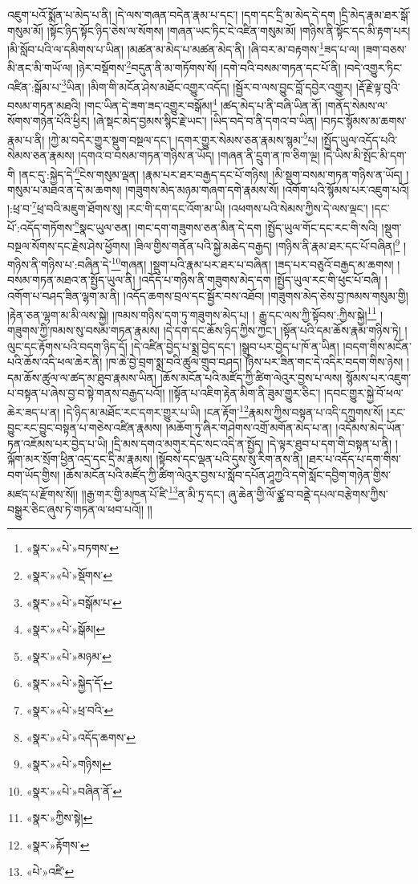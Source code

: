 འཇུག་པའོ་སྨོན་པ་མེད་པ་ནི། །དེ་ལས་གཞན་བདེན་རྣམ་པ་དང་། །དག་དང་དྲི་མ་མེད་དེ་དག །དྲི་མེད་རྣམ་ཐར་སྒོ་གསུམ་མོ། །སྟོང་ཉིད་སྟོང་ཉིད་ཅེས་ལ་སོགས། །གཞན་ཡང་ཏིང་ངེ་འཛིན་གསུམ་མོ། །གཉིས་ནི་སྟོང་དང་མི་རྟག་པར། །མི་སློབ་པའི་ལ་དམིགས་པ་ཡིན། །མཚན་མ་མེད་པ་མཚན་མེད་ནི། །ཞི་བར་མ་བརྟགས་\footnote{«སྣར་»«པེ་»བཏགས་}ཟད་པ་ལ། །ཟག་བཅས་མི་ནང་མི་གཡོ་ལ། །ཉེར་བསྡོགས་\footnote{«སྣར་»«པེ་»སྡོགས་}བདུན་ནི་མ་གཏོགས་སོ། །དགེ་བའི་བསམ་གཏན་དང་པོ་ནི། །བདེ་འགྱུར་ཏིང་འཛིན་:སྒོམ་པ་\footnote{«སྣར་»«པེ་»བསྒོམ་པ་}ཡིན། །མིག་གི་མངོན་ཤེས་མཐོང་འགྱུར་འདོད། །སྦྱོར་བ་ལས་བྱུང་བློ་དབྱེར་འགྱུར། །རྡོ་རྗེ་ལྟ་བུའི་བསམ་གཏན་མཐའི། །གང་ཡིན་དེ་ཟག་ཟད་འགྱུར་བསྒོམ།\footnote{«སྣར་»«པེ་»སྒོམ།} །ཚད་མེད་པ་ནི་བཞི་ཡིན་ནོ། །གནོད་སེམས་ལ་སོགས་གཉེན་པོའི་ཕྱིར། །ཞེ་སྡང་མེད་བྱམས་སྙིང་རྗེ་ཡང་། །ཡིད་བདེ་བ་ནི་དགའ་བ་ཡིན། །བཏང་སྙོམས་མ་ཆགས་རྣམ་པ་ནི། །ཀྱེ་མ་བདེར་གྱུར་སྡུག་བསྔལ་དང་། །དགར་གྱུར་སེམས་ཅན་རྣམས་སྙམ་\footnote{«སྣར་»«པེ་»མཉམ་}པ། །སྤྱོད་ཡུལ་འདོད་པའི་སེམས་ཅན་རྣམས། །དགའ་བ་བསམ་གཏན་གཉིས་ན་ཡོད། །གཞན་ནི་དྲུག་ན་ཁ་ཅིག་ལྔ། །དེ་ཡིས་མི་སྤོང་མི་དག་གི །ནང་དུ་:སྐྱེད་དེ་\footnote{«སྣར་»«པེ་»སྐྱེད་དོ་}ངེས་གསུམ་ལྡན། །རྣམ་པར་ཐར་བརྒྱད་དང་པོ་གཉིས། །མི་སྡུག་བསམ་གཏན་གཉིས་ན་ཡོད། །གསུམ་པ་མཐའ་ན་དེ་མ་ཆགས། །གཟུགས་མེད་མཉམ་གཞག་དགེ་རྣམས་སོ། །འགོག་པའི་སྙོམས་པར་འཇུག་པའོ། །:ཕྲ་བ་\footnote{«སྣར་»«པེ་»ཕྲ་བའི་}ཕྲ་བའི་མཇུག་ཐོགས་སུ། །རང་གི་དག་དང་འོག་མ་ཡི། །འཕགས་པའི་སེམས་ཀྱིས་དེ་ལས་ལྡང་། །དང་པོ་:འདོད་གཏོགས་\footnote{«སྣར་»«པེ་»འདོད་ཆགས་}སྣང་ཡུལ་ཅན། །གང་དག་གཟུགས་ཅན་མིན་དེ་དག །སྤྱོད་ཡུལ་གོང་དང་རང་གི་སའི། །སྡུག་བསྔལ་སོགས་དང་རྗེས་ཤེས་ཕྱོགས། །ཟིལ་གྱིས་གནོན་པའི་སྐྱེ་མཆེད་བརྒྱད། །གཉིས་ནི་རྣམ་ཐར་དང་པོ་བཞིན།\footnote{«སྣར་»«པེ་»གཉིས།} །གཉིས་ནི་གཉིས་པ་:བཞིན་དེ་\footnote{«སྣར་»«པེ་»བཞིན་ནོ་}གཞན། །སྡུག་པའི་རྣམ་པར་ཐར་པ་བཞིན། །ཟད་པར་བཅུའོ་བརྒྱད་མ་ཆགས། །བསམ་གཏན་མཐའ་ན་སྤྱོད་ཡུལ་ནི། །འདོད་པ་གཉིས་ནི་གཟུགས་མེད་དག །སྤྱོད་ཡུལ་རང་གི་ཕུང་པོ་བཞི། །འགོག་པ་བཤད་ཟིན་ལྷག་མ་ནི། །འདོད་ཆགས་བྲལ་དང་སྦྱོར་བས་འཐོབ། །གཟུགས་མེད་ཅེས་བྱ་ཁམས་གསུམ་གྱི། །རྟེན་ཅན་ལྷག་མ་མི་ལས་སྐྱེ། །ཁམས་གཉིས་དག་ཏུ་གཟུགས་མེད་པ། །
རྒྱུ་དང་ལས་ཀྱི་སྟོབས་:ཀྱིས་སྐྱེ།\footnote{«སྣར་»ཀྱིས་སྟེ།} །གཟུགས་ཀྱི་ཁམས་སུ་བསམ་གཏན་རྣམས། །དེ་དག་དང་ཆོས་ཉིད་ཀྱིས་ཀྱང་། །སྟོན་པའི་དམ་ཆོས་རྣམ་གཉིས་ཏེ། །ལུང་དང་རྟོགས་པའི་བདག་ཉིད་དོ། །དེ་འཛིན་བྱེད་པ་སྨྲ་བྱེད་དང་། །སྒྲུབ་པར་བྱེད་པ་ཁོ་ན་ཡིན། །བདག་གིས་མངོན་པའི་ཆོས་འདི་ཕལ་ཆེར་ནི། །ཁ་ཆེ་བྱེ་བྲག་སྨྲ་བའི་ཚུལ་གྲུབ་བཤད། །ཉེས་པར་ཟིན་གང་དེ་འདིར་བདག་གིས་ཉེས། །དམ་ཆོས་ཚུལ་ལ་ཚད་མ་ཐུབ་རྣམས་ཡིན། །ཆོས་མངོན་པའི་མཛོད་ཀྱི་ཚིག་ལེའུར་བྱས་པ་ལས། སྙོམས་པར་འཇུག་པ་བསྟན་པ་ཞེས་བྱ་བ་སྟེ་གནས་བརྒྱད་པའོ།། །།སྟོན་པ་འཇིག་རྟེན་མིག་ནི་ཟུམ་གྱུར་ཅིང་། །དབང་གྱུར་སྐྱེ་བོ་ཕལ་ཆེར་ཟད་པ་ན། །དེ་ཉིད་མ་མཐོང་རང་དགར་གྱུར་པ་ཡི། །ངན་རྟོག་\footnote{«སྣར་»རྟོགས་}རྣམས་ཀྱིས་བསྟན་པ་འདི་དཀྲུགས་སོ། །རང་བྱུང་རང་བྱུང་བསྟན་པ་གཅེས་འཛིན་རྣམས། །མཆོག་ཏུ་ཞིར་གཤེགས་འགྲོ་མགོན་མེད་པ་ན། །འདོམས་མེད་ཡོན་ཏན་འཇོམས་པར་བྱེད་པ་ཡི། །དྲི་མས་དགའ་མགུར་དེང་སང་འདི་ན་སྤྱོད། །དེ་ལྟར་ཐུབ་པ་དག་གི་བསྟན་པ་ནི། །ལྐོག་མར་སྲོག་ཕྱིན་འདྲ་དང་དྲི་མ་རྣམས། །སྟོབས་དང་ལྡན་པའི་དུས་སུ་རིག་ནས་ནི། །ཐར་པ་འདོད་པ་དག་གིས་བག་ཡོད་གྱིས། །ཆོས་མངོན་པའི་མཛོད་ཀྱི་ཚིག་ལེའུར་བྱས་པ་སློབ་དཔོན་ཤཱཀྱའི་དགེ་སློང་དབྱིག་གཉེན་གྱིས་མཛད་པ་རྫོགས་སོ།། །།རྒྱ་གར་གྱི་མཁན་པོ་ཛི་\footnote{«པེ་»འཛི་}ན་མི་ཏྲ་དང་། ཞུ་ཆེན་གྱི་ལོ་ཙྪ་བ་བནྡེ་དཔལ་བརྩེགས་ཀྱིས་བསྒྱུར་ཅིང་ཞུས་ཏེ་གཏན་ལ་ཕབ་པའོ།། །།